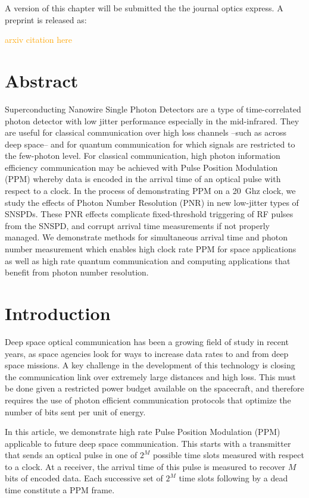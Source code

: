 \documentclass[11pt]{caltech_thesis} %
\begin{document}
A version of this chapter will be submitted the the journal optics
express. A preprint is released as:

\textcolor{orange}{arxiv citation here}

\hypertarget{abstract-2}{%
\section{Abstract}\label{abstract-2}}

Superconducting Nanowire Single Photon Detectors are a type of
time-correlated photon detector with low jitter performance especially
in the mid-infrared. They are useful for classical communication over
high loss channels --such as across deep space-- and for quantum
communication for which signals are restricted to the few-photon level.
For classical communication, high photon information efficiency
communication may be achieved with Pulse Position Modulation (PPM)
whereby data is encoded in the arrival time of an optical pulse with
respect to a clock. In the process of demonstrating PPM on a 20~Ghz
clock, we study the effects of Photon Number Resolution (PNR) in new
low-jitter types of SNSPDs. These PNR effects complicate fixed-threshold
triggering of RF pulses from the SNSPD, and corrupt arrival time
measurements if not properly managed. We demonstrate methods for
simultaneous arrival time and photon number measurement which enables
high clock rate PPM for space applications as well as high rate quantum
communication and computing applications that benefit from photon number
resolution.

\hypertarget{introduction-2}{%
\section{Introduction}\label{introduction-2}}

Deep space optical communication has been a growing field of study in
recent years, as space agencies look for ways to increase data rates to
and from deep space missions. A key challenge in the development of this
technology is closing the communication link over extremely large
distances and high loss. This must be done given a restricted power
budget available on the spacecraft, and therefore requires the use of
photon efficient communication protocols that optimize the number of
bits sent per unit of energy.

In this article, we demonstrate high rate Pulse Position Modulation
(PPM) applicable to future deep space communication. This starts with a
transmitter that sends an optical pulse in one of $2^M$ possible time
slots measured with respect to a clock. At a receiver, the arrival time
of this pulse is measured to recover $M$ bits of encoded data. Each
successive set of $2^M$ time slots following by a dead time constitute a
PPM frame.
\end{document}
